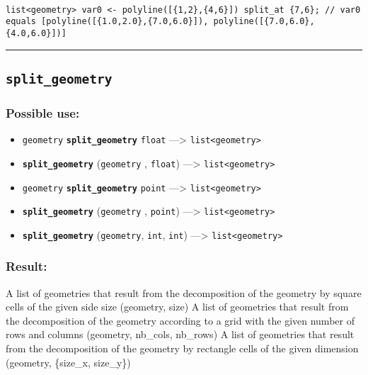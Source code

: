 \documentclass[]{book}
\providecommand{\tightlist}{%
  \setlength{\itemsep}{0pt}\setlength{\parskip}{0pt}}
\theoremstyle{definition}
\theoremstyle{definition}
\theoremstyle{definition}
\theoremstyle{remark}
\begin{document}
\begin{verbatim}
 
list<geometry> var0 <- polyline([{1,2},{4,6}]) split_at {7,6}; // var0 equals [polyline([{1.0,2.0},{7.0,6.0}]), polyline([{7.0,6.0},{4.0,6.0}])]
\end{verbatim}

\begin{center}\rule{0.5\linewidth}{\linethickness}\end{center}

\subsection{\texorpdfstring{\texttt{split\_geometry}}{split\_geometry}}\label{split_geometry}

\subsubsection{Possible use:}\label{possible-use-493}

\begin{itemize}
\tightlist
\item
  \texttt{geometry} \textbf{\texttt{split\_geometry}} \texttt{float}
  ---\textgreater{} \texttt{list\textless{}geometry\textgreater{}}
\item
  \textbf{\texttt{split\_geometry}} (\texttt{geometry} , \texttt{float})
  ---\textgreater{} \texttt{list\textless{}geometry\textgreater{}}
\item
  \texttt{geometry} \textbf{\texttt{split\_geometry}} \texttt{point}
  ---\textgreater{} \texttt{list\textless{}geometry\textgreater{}}
\item
  \textbf{\texttt{split\_geometry}} (\texttt{geometry} , \texttt{point})
  ---\textgreater{} \texttt{list\textless{}geometry\textgreater{}}
\item
  \textbf{\texttt{split\_geometry}} (\texttt{geometry}, \texttt{int},
  \texttt{int}) ---\textgreater{}
  \texttt{list\textless{}geometry\textgreater{}}
\end{itemize}

\subsubsection{Result:}\label{result-477}

A list of geometries that result from the decomposition of the geometry
by square cells of the given side size (geometry, size) A list of
geometries that result from the decomposition of the geometry according
to a grid with the given number of rows and columns (geometry, nb\_cols,
nb\_rows) A list of geometries that result from the decomposition of the
geometry by rectangle cells of the given dimension (geometry, \{size\_x,
size\_y\})
\end{document}
